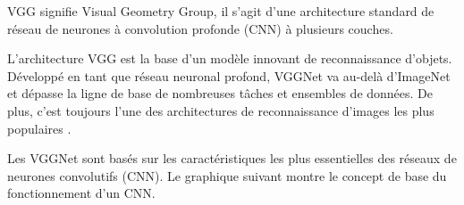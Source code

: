 	VGG signifie Visual Geometry Group, il s'agit d'une architecture standard de réseau de neurones à convolution profonde (CNN) à plusieurs couches. %
	
	
	
	L'architecture VGG est  la base d'un modèle innovant de reconnaissance d'objets. Développé en tant que réseau neuronal profond, VGGNet va au-delà d'ImageNet et dépasse la ligne de base  de nombreuses tâches et ensembles de données. De plus, c'est toujours l'une des architectures de reconnaissance d'images les plus populaires \cite{tammina2019transfer, antoine2018apprentissage}.
	
	Les VGGNet sont basés sur les caractéristiques les plus essentielles des réseaux de neurones convolutifs (CNN). Le graphique suivant montre le concept de base du fonctionnement d'un CNN.
	
